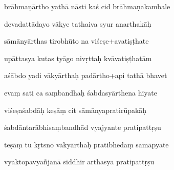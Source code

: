 \documentclass[article,12pt,a4paper]{memoir}%
\newcounter{parCount}
\begin{document}
	  
	  \pstart {} brāhmaṇārtho yathā nāsti kaś cid brāhmaṇakambale 
	{}
	\pend%
      

	  
	  \pstart \leavevmode%
	devadattādayo vākye tathaiva syur anarthakāḥ 
	{}
	\pend%
      

	  
	  \pstart {} sāmānyārthas tirobhūto na viśeṣe+avatiṣṭhate 
	{}
	\pend%
      

	  
	  \pstart \leavevmode%
	upāttasya kutas tyāgo nivṛttaḥ kvāvatiṣṭhatām 
	{}
	\pend%
      

	  
	  \pstart {} aśābdo yadi vākyārthaḥ padārtho+api tathā bhavet 
	{}
	\pend%
      

	  
	  \pstart \leavevmode%
	evaṃ sati ca saṃbandhaḥ śabdasyārthena hīyate 
	{}
	\pend%
      

	  
	  \pstart {} viśeṣaśabdāḥ keṣāṃ cit sāmānyapratirūpakāḥ 
	{}
	\pend%
      

	  
	  \pstart \leavevmode%
	śabdāntarābhisaṃbandhād vyajyante pratipattṛṣu 
	{}
	\pend%
      

	  
	  \pstart {} teṣāṃ tu kṛtsno vākyārthaḥ pratibhedaṃ samāpyate 
	{}
	\pend%
      

	  
	  \pstart \leavevmode%
	vyaktopavyañjanā siddhir arthasya pratipattṛṣu 
	{}
	\pend%
      
\end{document}
